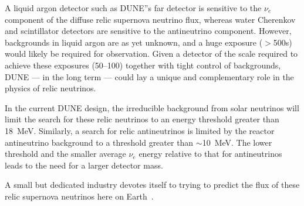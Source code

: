 A liquid argon detector such as DUNE''s far detector is sensitive to
the $\nu_e$ component of the diffuse relic supernova neutrino flux,
whereas water Cherenkov and scintillator detectors are sensitive to
the antineutrino component.  However, backgrounds in liquid argon are as
yet unknown, and a huge exposure ($>$\SI{500}{\ktyr}s)
would likely be required for observation.  Given a detector of the
scale required to achieve these exposures (\SIrange{50}{100}{\kt})
together with tight control of
backgrounds, %
DUNE --- in the long term --- could %
lay a unique and
  complementary role in the physics of relic neutrinos.

%
In the current DUNE design, the irreducible background from solar
neutrinos will limit the search for these relic neutrinos to an energy
threshold greater than \SI{18}{MeV}.  Similarly, a search for relic
antineutrinos is limited by the reactor antineutrino background to a
threshold greater than $\sim$\SI{10}{MeV}. The lower threshold and the
smaller average $\nu_e$ energy relative to that for antineutrinos
leads to the need for a larger detector
mass.

A small but dedicated industry devotes itself to trying to predict the
flux of these relic supernova neutrinos here on
Earth~\cite{Totani:1995dw,Sato:1997sc,Hartmann:1997qe,Malaney:1996ar,Kaplinghat:1999xi,Ando:2005ka,Lunardini:2006pd,Fukugita:2002qw}. 


